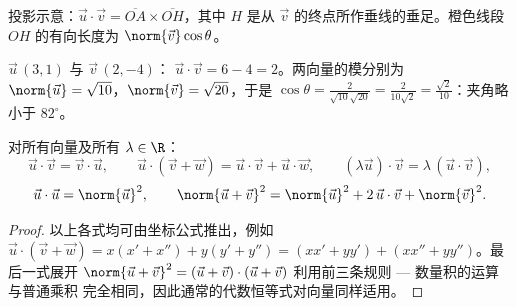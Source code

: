 \begin{omfigure}

{\small 投影示意：$\vec u \cdot \vec v = \overline{OA} \times
\overline{OH}$，其中 $H$ 是从
$\vec v$ 的终点所作垂线的垂足。橙色线段 $OH$ 的有向长度为
$\norm{\vec v}\cos\theta$。}
\end{omfigure}

\begin{example}\label{ex:g11:scal:compute}
$\vec u\,(3, 1)$ 与 $\vec v\,(2, -4)$：
$\vec u \cdot \vec v = 6 - 4 = 2$。两向量的模分别为
$\norm{\vec u} = \sqrt{10}$，$\norm{\vec v} = \sqrt{20}$，于是
$\cos\theta = \frac{2}{\sqrt{10}\sqrt{20}} = \frac{2}{10\sqrt2}
= \frac{\sqrt2}{10}$：夹角略小于 $82^\circ$。
\end{example}

\begin{proposition}[代数运算规则]\label{prop:g11:scal:rules}
对所有向量及所有 $\lambda \in \R$：
\[
\vec u \cdot \vec v = \vec v \cdot \vec u, \qquad
\vec u \cdot (\vec v + \vec w) = \vec u \cdot \vec v + \vec u \cdot
\vec w, \qquad
(\lambda \vec u)\cdot \vec v = \lambda\,(\vec u \cdot \vec v),
\]
\[
\vec u \cdot \vec u = \norm{\vec u}^2,
\qquad
\norm{\vec u + \vec v}^2 = \norm{\vec u}^2 + 2\,\vec u\cdot\vec v +
\norm{\vec v}^2 .
\]
\end{proposition}

\begin{proof}
以上各式均可由坐标公式推出，例如
$\vec u \cdot (\vec v + \vec w) = x(x' + x'') + y(y' + y'') =
(xx' + yy') + (xx'' + yy'')$。最后一式展开
$\norm{\vec u + \vec v}^2 = (\vec u + \vec v)\cdot(\vec u + \vec v)$
利用前三条规则 --- 数量积的运算与普通乘积
完全相同，因此通常的代数恒等式对向量同样适用。
\end{proof}

